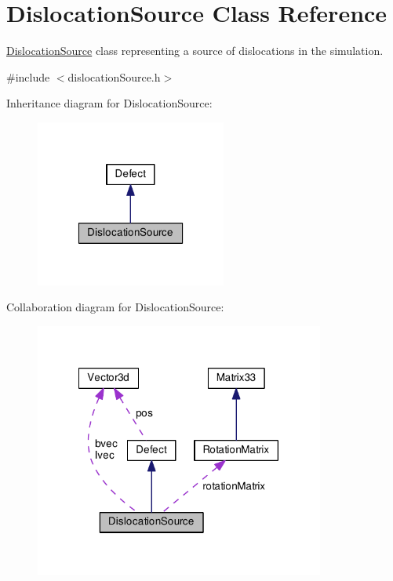 \hypertarget{classDislocationSource}{\section{Dislocation\-Source Class Reference}
\label{de/de3/classDislocationSource}
}


\hyperlink{classDislocationSource}{Dislocation\-Source} class representing a source of dislocations in the simulation.  




{\ttfamily \#include $<$dislocation\-Source.\-h$>$}



Inheritance diagram for Dislocation\-Source\-:\nopagebreak
\begin{figure}[H]
\begin{center}
\leavevmode
\includegraphics[width=178pt]{dc/d96/classDislocationSource__inherit__graph}
\end{center}
\end{figure}


Collaboration diagram for Dislocation\-Source\-:\nopagebreak
\begin{figure}[H]
\begin{center}
\leavevmode
\includegraphics[width=270pt]{da/d4c/classDislocationSource__coll__graph}
\end{center}
\end{figure}
